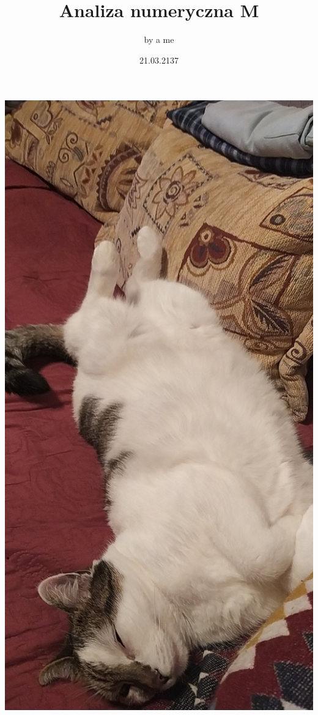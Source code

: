 \documentclass{article}[13pt]
\title {Analiza numeryczna M}
\author{by a me}
\date {21.03.2137}
\begin{document}
\maketitle

\newpage

\begin{center}
\includegraphics[height=\textheight]{./kycia.jpg}
\end{center}

\newpage

\tableofcontents

\newpage


\end{document}
